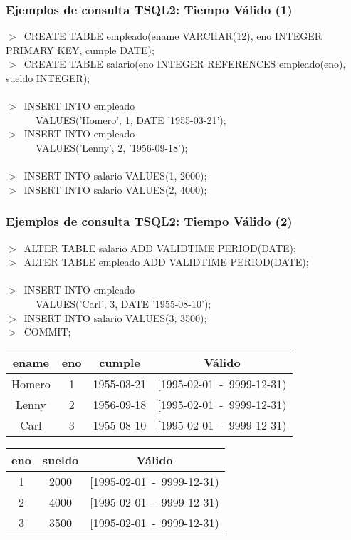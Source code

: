 \documentclass[12pt]{beamer}
\begin{document}
\begin{frame}
\frametitle{Ejemplos de consulta TSQL2: Tiempo V\'alido (1)}
$>$\ CREATE TABLE empleado(ename VARCHAR(12), eno INTEGER PRIMARY KEY, cumple DATE);\\
$>$\ CREATE TABLE salario(eno INTEGER REFERENCES empleado(eno), sueldo INTEGER);\\
\ \\
$>$\ INSERT INTO empleado\\
\ \ \ \ \ \ VALUES('Homero', 1, DATE '1955-03-21');\\
$>$\ INSERT INTO empleado\\
\ \ \ \ \ \ VALUES('Lenny', 2, '1956-09-18');\\
\ \\
$>$\ INSERT INTO salario VALUES(1, 2000);\\
$>$\ INSERT INTO salario VALUES(2, 4000);\\

\end{frame}

\begin{frame}
\frametitle{Ejemplos de consulta TSQL2: Tiempo V\'alido (2)}
\begin{small}
$>$\ ALTER TABLE salario ADD VALIDTIME PERIOD(DATE);\\
$>$\ ALTER TABLE empleado ADD VALIDTIME PERIOD(DATE);\\
\ \\
$>$\ INSERT INTO empleado\\
\ \ \ \ \ \ VALUES('Carl', 3, DATE '1955-08-10');\\
$>$\ INSERT INTO salario VALUES(3, 3500);\\
$>$\ COMMIT;
\ \\
\begin{center}
\begin{tabular}{|c|c|c||c|}
\hline
ename & eno & cumple & V\'alido\\
\hline
Homero & 1 & 1955-03-21 & [1995-02-01\ -\ 9999-12-31)\\
\hline
Lenny & 2 & 1956-09-18 & [1995-02-01\ -\ 9999-12-31)\\
\hline
Carl & 3 & 1955-08-10 & [1995-02-01\ -\ 9999-12-31)\\
\hline
\end{tabular}
\begin{tabular}{|c|c||c|}
\hline
eno & sueldo & V\'alido\\
\hline
1 & 2000 & [1995-02-01\ -\ 9999-12-31)\\
\hline
2 & 4000 & [1995-02-01\ -\ 9999-12-31)\\
\hline
3 & 3500 & [1995-02-01\ -\ 9999-12-31)\\
\hline
\end{tabular}
\end{center}
\end{small}

\end{frame}
\end{document}
